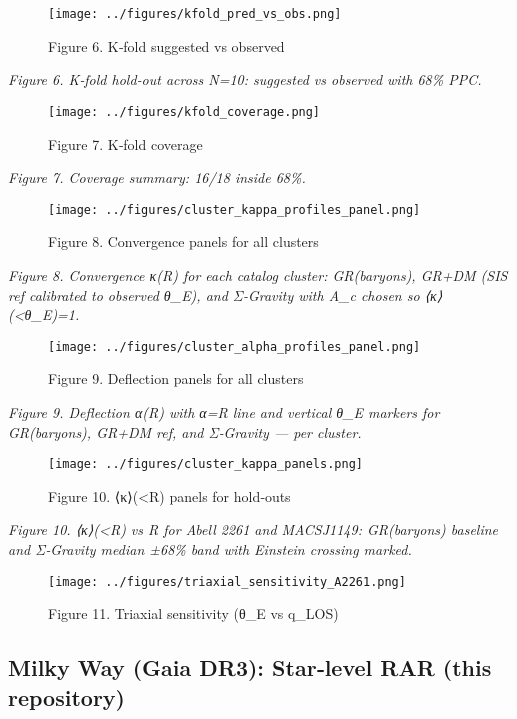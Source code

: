 \documentclass[11pt,a4paper]{article}
\begin{document}
\begin{figure}[h]
\centering
\texttt{[image: ../figures/kfold\_pred\_vs\_obs.png]}
\caption{Figure 6. K‑fold suggested vs observed}
\end{figure}


\textit{Figure 6. K‑fold hold‑out across N=10: suggested vs observed with 68\% PPC.}


\begin{figure}[h]
\centering
\texttt{[image: ../figures/kfold\_coverage.png]}
\caption{Figure 7. K‑fold coverage}
\end{figure}


\textit{Figure 7. Coverage summary: 16/18 inside 68\%.}


\begin{figure}[h]
\centering
\texttt{[image: ../figures/cluster\_kappa\_profiles\_panel.png]}
\caption{Figure 8. Convergence panels for all clusters}
\end{figure}


\textit{Figure 8. Convergence κ(R) for each catalog cluster: GR(baryons), GR+DM (SIS ref calibrated to observed θ\_E), and Σ‑Gravity with A\_c chosen so ⟨κ⟩(<θ\_E)=1.}


\begin{figure}[h]
\centering
\texttt{[image: ../figures/cluster\_alpha\_profiles\_panel.png]}
\caption{Figure 9. Deflection panels for all clusters}
\end{figure}


\textit{Figure 9. Deflection α(R) with α=R line and vertical θ\_E markers for GR(baryons), GR+DM ref, and Σ‑Gravity — per cluster.}


\begin{figure}[h]
\centering
\texttt{[image: ../figures/cluster\_kappa\_panels.png]}
\caption{Figure 10. ⟨κ⟩(<R) panels for hold‑outs}
\end{figure}


\textit{Figure 10. ⟨κ⟩(<R) vs R for Abell 2261 and MACSJ1149: GR(baryons) baseline and Σ‑Gravity median ±68\% band with Einstein crossing marked.}


\begin{figure}[h]
\centering
\texttt{[image: ../figures/triaxial\_sensitivity\_A2261.png]}
\caption{Figure 11. Triaxial sensitivity (θ_E vs q_LOS)}
\end{figure}


\subsection{Milky Way (Gaia DR3): Star‑level RAR (this repository)}
\end{document}
